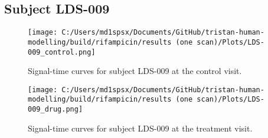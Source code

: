 \documentclass{epflreport}%
\begin{document}
\subsection{Subject LDS{-}009}%
\label{subsec:SubjectLDS{-}009}%

%


\begin{figure}[h!]%
\centering%
\texttt{[image: C:/Users/md1spsx/Documents/GitHub/tristan-human-modelling/build/rifampicin/results (one scan)/Plots/LDS-009\_control.png]}%
\caption{Signal{-}time curves for subject LDS{-}009 at the control visit.}%
\end{figure}

%


\begin{figure}[h!]%
\centering%
\texttt{[image: C:/Users/md1spsx/Documents/GitHub/tristan-human-modelling/build/rifampicin/results (one scan)/Plots/LDS-009\_drug.png]}%
\caption{Signal{-}time curves for subject LDS{-}009 at the treatment visit.}%
\end{figure}
\end{document}
